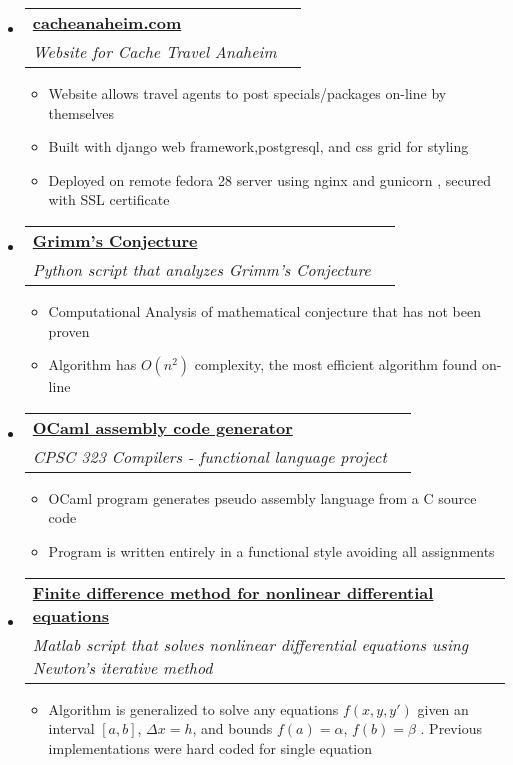 \documentclass[letterpaper,11pt]{article}
\makeatletter
\newcommand{\resitem}[1]{\item #1 \vspace{-2pt}}
\newcommand{\resheading}[1]{{ \Large  \vspace{-20pt}\parashade[.9]{sharpcorners}{\textbf{\color{blue}#1 \vphantom{p\^{E}}}} \vspace{-20pt}}}
\newcommand{\ressubheading}[4]{
\begin{tabular*}{6.5in}{l@{\extracolsep{\fill}}r}
		\textbf{#1} & #2 \\
		\textit{#3} & \textit{#4} \\
\end{tabular*}\vspace{-6pt}}
\makeatother
\begin{document}
\resheading{Projects}
\begin{itemize}
\item
	\ressubheading{\href{https://github.com/glezluis/cachetravel}{cacheanaheim.com}}{}{Website for Cache Travel Anaheim}{}
	\begin{itemize}
		\resitem{Website allows travel agents to post specials/packages on-line by themselves}
		\resitem{Built with django web framework,postgresql, and css grid for styling}
		\resitem{Deployed on remote fedora 28 server using nginx and gunicorn , secured with SSL certificate}
	\end{itemize}
\item
	\ressubheading{\href{https://github.com/glezluis/grimms-conjecture}{Grimm's Conjecture}}{}{Python script that analyzes Grimm's Conjecture}{}
	\begin{itemize}
		\resitem{Computational Analysis of mathematical conjecture that has not been proven}
		\resitem{Algorithm has $O(n^2)$ complexity, the most efficient algorithm found on-line}
	\end{itemize}

\item
	\ressubheading{\href{https://github.com/glezluis/OCaml-assembly-generator}{OCaml assembly code generator}}{}{CPSC 323 Compilers - functional language project}{}
	\begin{itemize}
		\resitem{OCaml program generates pseudo assembly language from a C source code}
		\resitem{Program is written entirely in a functional style avoiding all assignments}
	\end{itemize}

\item
	\ressubheading{\href{https://github.com/glezluis/nonlinear-finite-difference}{Finite difference method for nonlinear differential equations}}{}{Matlab script that solves nonlinear differential equations using Newton's iterative method}{}
	\begin{itemize}
		\resitem{Algorithm is generalized to solve any equations $f(x,y,y')$ given an interval $[a,b]$, $\Delta x = h$, and bounds $f(a) = \alpha$, $f(b) = \beta$}. Previous implementations were hard coded for single equation
		
	\end{itemize}

\end{itemize}
\end{document}
